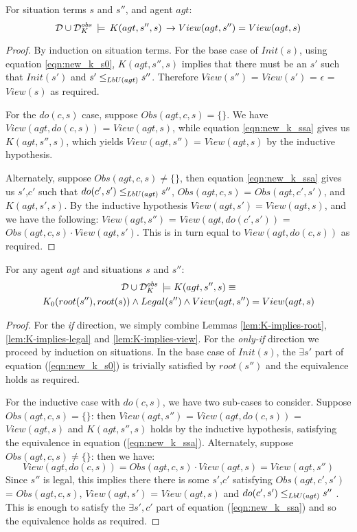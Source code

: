 \begin{lemma}
\label{lem:K-implies-view}For situation terms $s$ and $s''$, and
agent $agt$:\[
\mathcal{D}\cup\mathcal{D}_{K}^{obs}\,\models\, K(agt,s'',s)\,\rightarrow View(agt,s'')=View(agt,s)\]

\end{lemma}
\begin{proof}
By induction on situation terms. For the base case of $Init(s)$,
using equation \eqref{eqn:new_k_s0}, $K(agt,s'',s)$ implies that
there must be an $s'$ such that $Init(s')$ and $s'\leq_{LbU(agt)}s''$.
Therefore $View(s'')$ = $View(s')$ = $\epsilon$ = $View(s)$ as
required.

For the $do(c,s)$ case, suppose $Obs(agt,c,s)=\{\}$. We have $View(agt,do(c,s))$
= $View(agt,s)$, while equation \eqref{eqn:new_k_ssa} gives us $K(agt,s'',s)$,
which yields $View(agt,s'')$ = $View(agt,s)$ by the inductive hypothesis.

Alternately, suppose $Obs(agt,c,s)\neq\{\}$, then equation \eqref{eqn:new_k_ssa}
gives us $s'$,$c'$ such that $do(c',s')\leq_{LbU(agt)}s''$, $Obs(agt,c,s)$
= $Obs(agt,c',s')$, and $K(agt,s',s)$. By the inductive hypothesis
$View(agt,s')=View(agt,s)$, and we have the following: $View(agt,s'')$
= $View(agt,do(c',s'))$ = $Obs(agt,c,s)\cdot View(agt,s')$. This
is in turn equal to $View(agt,do(c,s))$ as required. 
\end{proof}
\medskip{}


\begin{thmext}
[\ref{thm:k_obs_equiv}] For any agent $agt$ and situations
$s$ and $s''$:\begin{multline*}
\mathcal{D}\cup\mathcal{D}_{K}^{obs}\,\models K(agt,s'',s)\equiv\\
K_{0}(root(s''),root(s))\wedge Legal(s'')\wedge View(agt,s'')=View(agt,s)\end{multline*}

\end{thmext}
\begin{proof}
For the \emph{if} direction, we simply combine Lemmas \ref{lem:K-implies-root},
\ref{lem:K-implies-legal} and \ref{lem:K-implies-view}. For the
\emph{only-if} direction we proceed by induction on situations. In
the base case of $Init(s)$, the $\exists s'$ part of equation (\ref{eqn:new_k_s0})
is trivially satisfied by $root(s'')$ and the equivalence holds as
required.

For the inductive case with $do(c,s)$, we have two sub-cases to consider.
Suppose $Obs(agt,c,s)=\{\}$: then $View(agt,s'')$ = $View(agt,do(c,s))$
= $View(agt,s)$ and $K(agt,s'',s)$ holds by the inductive hypothesis,
satisfying the equivalence in equation (\ref{eqn:new_k_ssa}). Alternately,
suppose $Obs(agt,c,s)\neq\{\}$: then we have:\[
View(agt,do(c,s))=Obs(agt,c,s)\cdot View(agt,s)=View(agt,s'')\]
 Since $s''$ is legal, this implies there there is some $s'$,$c'$
satisfying $Obs(agt,c',s')$ = $Obs(agt,c,s)$, $View(agt,s')$ =
$View(agt,s)$ and $do(c',s')\leq_{LbU(agt)}s''$ . This is enough
to satisfy the $\exists s',c'$ part of equation (\ref{eqn:new_k_ssa})
and so the equivalence holds as required. 
\end{proof}
\bigskip{}


